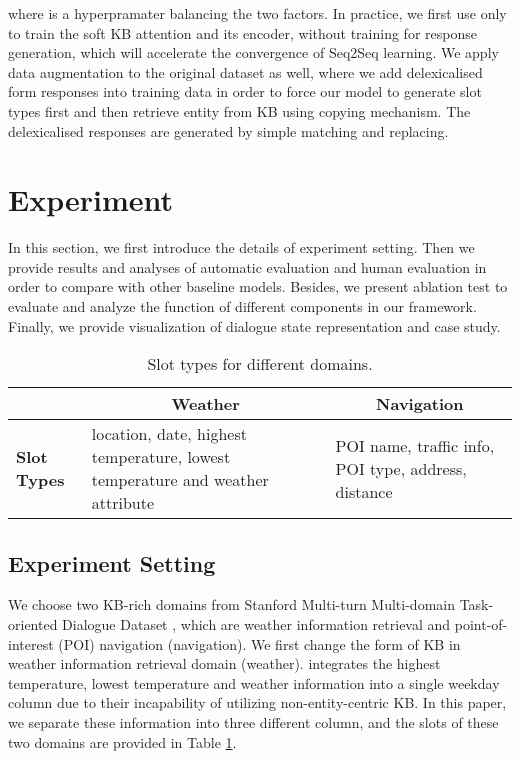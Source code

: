 \documentclass[11pt]{article}
\begin{document}
where  is a hyperpramater balancing the two factors. In practice, we first use  only to train the soft KB attention and its encoder, without training for response generation, which will accelerate the convergence of Seq2Seq learning. We apply data augmentation to the original dataset as well, where we add delexicalised form responses into training data in order to force our model to generate slot types first and then retrieve entity from KB using copying mechanism. The delexicalised responses are generated by simple matching and replacing.

\section{Experiment}
In this section, we first introduce the details of experiment setting. Then we provide results and analyses of automatic evaluation and human evaluation in order to compare with other baseline models. Besides, we present ablation test to evaluate and analyze the function of different components in our framework. Finally, we provide visualization of dialogue state representation and case study.
\begin{table}
	\label{table1}
	\begin{tabular}{l|p{6.5cm}|p{6.5cm}}
		&\multicolumn{1}{c|}{\textbf{Weather}}&\multicolumn{1}{c}{\textbf{Navigation}}\\\hline
		\textbf{Slot Types}& location, date, highest temperature, lowest temperature and weather attribute&POI name, traffic info, POI type, address, distance\\
	\end{tabular}
	\caption{Slot types for different domains.}
\end{table}
\subsection{Experiment Setting}
We choose two KB-rich domains from Stanford Multi-turn Multi-domain Task-oriented Dialogue Dataset  , which are weather information retrieval and point-of-interest (POI) navigation (navigation). We first change the form of KB in weather information retrieval domain (weather).  integrates the highest temperature, lowest temperature and weather information into a single weekday column due to their incapability of utilizing non-entity-centric KB. In this paper, we separate these information into three different column, and the slots of these two domains are provided in Table \ref{table1}.
\end{document}
